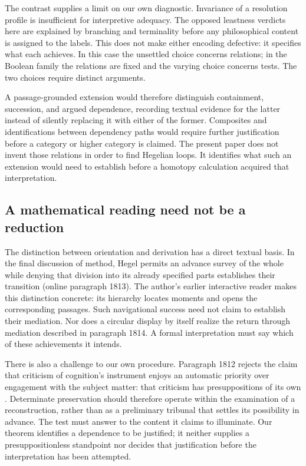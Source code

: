 The contrast supplies a limit on our own diagnostic. Invariance of a
resolution profile is insufficient for interpretive adequacy. The
opposed leastness verdicts here are explained by branching and
terminality before any philosophical content is assigned to the
labels. This does not make either encoding defective: it specifies
what each achieves. In this case the unsettled choice concerns
relations; in the Boolean family the relations are fixed and the
varying choice concerns tests. The two choices require distinct
arguments.

A passage-grounded extension would therefore distinguish containment,
succession, and argued dependence, recording textual evidence for the
latter instead of silently replacing it with either of the former.
Composites and identifications between dependency paths would require
further justification before a category or higher category is claimed.
The present paper does not invent those relations in order to find
Hegelian loops. It identifies what such an extension would need to
establish before a homotopy calculation acquired that interpretation.

\subsection{A mathematical reading need not be a reduction}

The distinction between orientation and derivation has a direct textual
basis. In the final discussion of method, Hegel permits an advance survey
of the whole while denying that division into its already specified parts
establishes their transition (online paragraph 1813). The author's earlier
interactive reader \cite{AutioReader} makes this distinction concrete:
its hierarchy locates moments and opens the corresponding passages.
Such navigational success need not claim to establish their mediation.
Nor does a circular display by itself realize the return through mediation
described in paragraph 1814. A formal interpretation must say which of
these achievements it intends.

There is also a challenge to our own procedure. Paragraph 1812 rejects
the claim that criticism of cognition's instrument enjoys an automatic
priority over engagement with the subject matter: that criticism has
presuppositions of its own \cite{HegelIdea}. Determinate preservation
should therefore operate within the examination of a reconstruction,
rather than as a preliminary tribunal that settles its possibility in
advance. The test must answer to the content it claims to illuminate.
Our theorem identifies a dependence to be justified; it neither supplies
a presuppositionless standpoint nor decides that justification before
the interpretation has been attempted.


